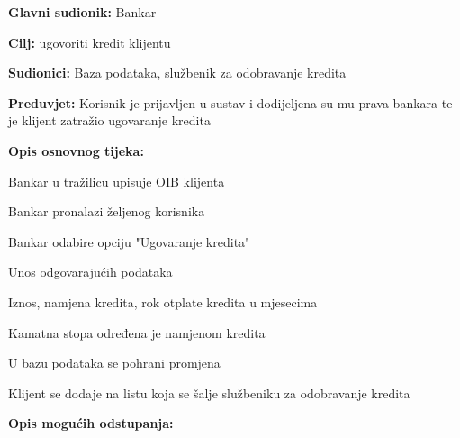                 
                
                 \noindent {}
                \begin{packed_item}
                	
                	\item \textbf{Glavni sudionik: }Bankar
                	\item  \textbf{Cilj:} ugovoriti kredit klijentu
                	\item  \textbf{Sudionici:} Baza podataka, službenik za odobravanje kredita
                	\item  \textbf{Preduvjet:} Korisnik je prijavljen u sustav i dodijeljena su mu prava bankara te je klijent zatražio ugovaranje kredita
                	\item  \textbf{Opis osnovnog tijeka:}
                	
                	\item[] \begin{packed_enum}
                		
                		\item Bankar u tražilicu upisuje OIB klijenta
                		\item Bankar pronalazi željenog korisnika
                		\item Bankar odabire opciju "Ugovaranje kredita"
                		\item Unos odgovarajućih podataka
                		\begin{packed_enum}
                			\item Iznos, namjena kredita, rok otplate kredita u mjesecima
                			\item Kamatna stopa određena je namjenom kredita
                		\end{packed_enum}
                		\item U bazu podataka se pohrani promjena 
                		\item Klijent se dodaje na listu koja se šalje službeniku za odobravanje kredita
                	\end{packed_enum}
                	
                	\item  \textbf{Opis mogućih odstupanja:} 
                	
                	\item[] \begin{packed_item}
                		

\end{packed_item}
\end{packed_item}
